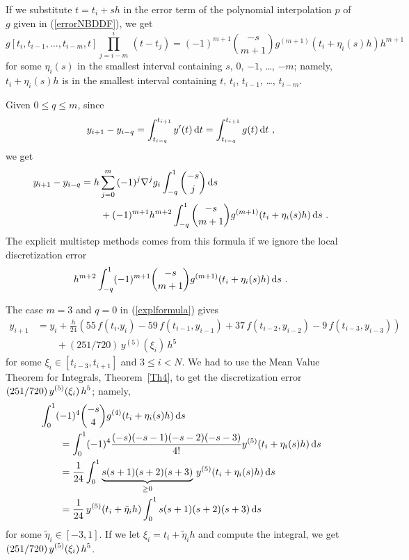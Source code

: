 If we substitute $t=t_i + sh$ in the error term of the polynomial
interpolation $p$ of $g$ given in (\ref{errorNBDDF}), we get
\[
g[t_i,t_{i-1},\ldots,t_{i-m},t]\prod_{j=i-m}^i\,(t-t_j) =
(-1)^{m+1} \binom{-s}{m+1} g^{(m+1)}(t_i+\eta_i(s) h) h^{m+1}
\]
for some $\eta_i(s)$ in the smallest interval containing $s$, $0$,
$-1$, \ldots, $-m$; namely, $t_i+\eta_i(s)h$ is in the smallest
interval containing $t$, $t_i$, $t_{i-1}$, \ldots , $t_{i-m}$.

Given $0\leq q \leq m$, since
\[
y_{i+1} - y_{i-q} = \int_{t_{i-q}}^{t_{i+1}} y'(t) \,\mathrm{d}t
= \int_{t_{i-q}}^{t_{i+1}} g(t)\,\mathrm{d}t \ ,
\]
we get
\begin{equation} \label{explformula}
\begin{split}
y_{i+1} - y_{i-q} &
= h \sum_{j=0}^m\,(-1)^j \nabla^j g_i \int_{-q}^1  \binom{-s}{j} \,\mathrm{d}s \\
&\qquad  + (-1)^{m+1}  h^{m+2}\int_{-q}^1 \binom{-s}{m+1}
g^{(m+1)}(t_i+\eta_i(s)h) \,\mathrm{d}s \ .
\end{split}
\end{equation}
The explicit multistep methods comes from this formula if we ignore
the local discretization error
\[
h^{m+2}\int_{-q}^1 (-1)^{m+1} \binom{-s}{m+1} g^{(m+1)}(t_i+\eta_i(s)h) \,\mathrm{d}s \ .
\]

The case $m=3$ and $q=0$ in (\ref{explformula}) gives
\begin{align*}
y_{i+1} & = y_i + \frac{h}{24} \left( 55 \, f(t_i.y_i) - 59 \,
f(t_{i-1},y_{i-1}) + 37\, f(t_{i-2},y_{i-2}) - 9 \,f(t_{i-3},y_{i-3})
\right) \\
&\qquad + (251/720)\,y^{(5)}(\xi_i)\,h^5
\end{align*} 
for some $\xi_i \in [t_{i-3},t_{i+1}]$ and $3 \leq i < N$.
We had to use the Mean Value Theorem for Integrals, Theorem~\ref{Th4},
to get the discretization error
$\displaystyle (251/720)\,y^{(5)}(\xi_i)\,h^5$; namely,
\begin{align*}
&\int_0^1 (-1)^4 \binom{-s}{4} g^{(4)}(t_i+\eta_i(s)h) \,\mathrm{d}s \\
&\qquad =
\int_0^1 (-1)^4 \frac{(-s)(-s-1)(-s-2)(-s-3)}{4!}
y^{(5)}(t_i+\eta_i(s)h) \,\mathrm{d}s \\
&\qquad = \frac{1}{24} \int_0^1 \underbrace{s(s+1)(s+2)(s+3)}_{\geq 0} \,
y^{(5)}(t_i+\eta_i(s)h) \,\mathrm{d}s \\
&\qquad
= \frac{1}{24}\, y^{(5)}(t_i+\tilde{\eta}_ih) \int_0^1 s(s+1)(s+2)(s+3) \,\mathrm{d}s
\end{align*}
for some $\tilde{\eta}_i \in [-3,1]$.
If we let $\xi_i = t_i+\tilde{\eta}_i h$ and compute the integral, we get\\
$\displaystyle (251/720)\,y^{(5)}(\xi_i)\,h^5$.

